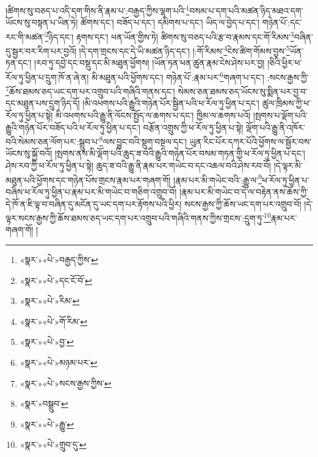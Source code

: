 །ཚིགས་སུ་བཅད་པ་འདི་དག་གིས་ནི་རྣམ་པ་:བརྒྱད་ཀྱིས་ལྷག་པའི་\footnote{«སྣར་»«པེ་»བརྒྱད་ཀྱིས་}བསམ་པ་དག་པའི་མཚན་ཉིད་མཐའ་དག་ཡོངས་སུ་བསྟན་པ་ཡིན་ཏེ། ཚོགས་དང་། བཟོད་པ་དང་། དམིགས་པ་དང་། ཡིད་ལ་བྱེད་པ་དང་། གཉེན་པོ་:དང་རང་གི་མཚན་\footnote{«སྣར་»«པེ་»དང་ངོ་བོ་}ཉིད་དང་། རྟགས་དང་། ཕན་ཡོན་གྱིས་ཏེ། ཚིགས་སུ་བཅད་པའི་རྩ་བ་རྣམས་དང་གོ་རིམས་\footnote{«སྣར་»«པེ་»རིམ་}བཞིན་དུ་སྦྱར་བར་རིག་པར་བྱའོ། །དེ་དག་གྲངས་དང་དེ་ཡི་མཚན་ཉིད་དང་། །:གོ་རིམས་\footnote{«སྣར་»«པེ་»གོ་རིམ་}ངེས་ཚིག་གོམས་བྱས་\footnote{«སྣར་»«པེ་»བྱ་}ཡོན་ཏན་དང་། །རབ་ཏུ་དབྱེ་དང་བསྡུ་དང་མི་མཐུན་ཕྱོགས། །ཡོན་ཏན་ཕན་ཚུན་རྣམ་ངེས་ཤེས་པར་བྱ། །ཅིའི་ཕྱིར་ཕ་རོལ་ཏུ་ཕྱིན་པ་དྲུག་ཁོ་ན་ཞེ་ན། མི་མཐུན་པའི་ཕྱོགས་དང་། གཉེན་པོ་:རྣམ་པར་\footnote{«སྣར་»«པེ་»མཉམ་པར་}གཞག་པ་དང་། :སངས་རྒྱས་ཀྱི་\footnote{«སྣར་»«པེ་»སངས་རྒྱས་ཀྱིས་}ཆོས་ཐམས་ཅད་ཡང་དག་པར་འགྲུབ་པའི་གཞིའི་གནས་དང་། སེམས་ཅན་ཐམས་ཅད་ཡོངས་སུ་སྨིན་པར་བྱ་བ་དང་མཐུན་པས་དྲུག་ཉིད་དོ། །མི་འཕགས་པའི་རྒྱུའི་གཉེན་པོར་སྦྱིན་པའི་ཕ་རོལ་ཏུ་ཕྱིན་པ་དང་། ཚུལ་ཁྲིམས་ཀྱི་ཕ་རོལ་ཏུ་ཕྱིན་པ་སྟེ། མི་འཕགས་པའི་རྒྱུ་ནི་ལོངས་སྤྱོད་ལ་ཆགས་པ་དང་། ཁྱིམ་ལ་ཆགས་པའོ། །སྤགས་པ་ལྡོག་པའི་རྒྱུའི་གཉེན་པོར་བཟོད་པའི་ཕ་རོལ་ཏུ་ཕྱིན་པ་དང་། བརྩོན་འགྲུས་ཀྱི་ཕ་རོལ་ཏུ་ཕྱིན་པ་སྟེ། ལྡོག་པའི་རྒྱུ་ནི་འཁོར་བའི་སེམས་ཅན་ལོག་པར་:སྒྲུབ་པ་\footnote{«སྣར་»བསྒྲུབ་}ལས་བྱུང་བའི་སྡུག་བསྔལ་དང་། ཡུན་རིང་པོར་དཀར་པོའི་ཕྱོགས་ལ་སྦྱོར་བས་ཡོངས་སུ་སྐྱོ་བའོ། །སྤགས་ནས་མི་ལྡོག་པའི་ཆུད་ཟ་བའི་རྒྱུའི་གཉེན་པོར་བསམ་གཏན་གྱི་ཕ་རོལ་ཏུ་ཕྱིན་པ་དང་། ཤེས་རབ་ཀྱི་ཕ་རོལ་ཏུ་ཕྱིན་པ་སྟེ། ཆུད་ཟ་བའི་རྒྱུ་ནི་རྣམ་པར་གཡེང་བ་དང་འཆལ་བའི་ཤེས་རབ་བོ། །དེ་ལྟར་མི་མཐུན་པའི་ཕྱོགས་དང་གཉེན་པོས་གྲངས་རྣམ་པར་གཞག་གོ། །རྣམ་པར་མི་གཡེང་བའི་:རྒྱུ་ལ་\footnote{«སྣར་»«པེ་»རྒྱུ་}ཕ་རོལ་ཏུ་ཕྱིན་པ་བཞིས་ཕ་རོལ་ཏུ་ཕྱིན་པ་རྣམ་པར་མི་གཡེང་བ་གཅིག་འགྲུབ་བོ། །རྣམ་པར་མི་གཡེང་བ་དེ་ལ་བརྟེན་ནས་ཆོས་ཀྱི་དེ་ཁོ་ན་ཇི་ལྟ་བ་བཞིན་དུ་མངོན་དུ་ཡང་དག་པར་རྟོགས་པའི་ཕྱིར། སངས་རྒྱས་ཀྱི་ཆོས་ཡང་དག་པར་འགྲུབ་བོ། །དེ་ལྟར་སངས་རྒྱས་ཀྱི་ཆོས་ཐམས་ཅད་ཡང་དག་པར་འགྲུབ་པའི་གཞིའི་གནས་ཀྱིས་གྲངས་:དྲུག་ཏུ་\footnote{«སྣར་»«པེ་»གྲུབ་དུ་}རྣམ་པར་གཞག་གོ། །
